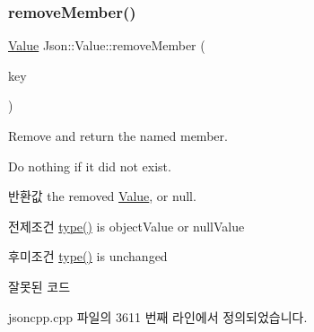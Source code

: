 \mbox{\label{class_json_1_1_value_aa52f7873b95d29627d6e83ba96f69aaa}} 
\subsubsection{\texorpdfstring{remove\+Member()}{removeMember()}\hspace{0.1cm}{\footnotesize\ttfamily [1/5]}}
{\footnotesize\ttfamily \hyperlink{class_json_1_1_value}{Value} Json\+::\+Value\+::remove\+Member (\begin{DoxyParamCaption}\item[{const char $\ast$}]{key }\end{DoxyParamCaption})}



Remove and return the named member. 

Do nothing if it did not exist. \begin{DoxyReturn}{반환값}
the removed \hyperlink{class_json_1_1_value}{Value}, or null. 
\end{DoxyReturn}
\begin{DoxyPrecond}{전제조건}
\hyperlink{class_json_1_1_value_a8ce61157a011894f0252ceed232312de}{type()} is object\+Value or null\+Value 
\end{DoxyPrecond}
\begin{DoxyPostcond}{후미조건}
\hyperlink{class_json_1_1_value_a8ce61157a011894f0252ceed232312de}{type()} is unchanged 
\end{DoxyPostcond}
\begin{DoxyRefDesc}{잘못된 코드}
\item[\hyperlink{deprecated__deprecated000001}{잘못된 코드}]\end{DoxyRefDesc}


jsoncpp.\+cpp 파일의 3611 번째 라인에서 정의되었습니다.


